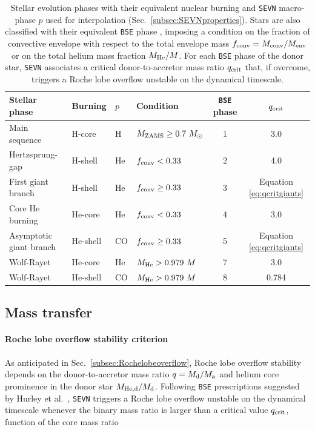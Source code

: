 \documentclass[a4paper,titlepage]{book}     	%
\newcommand{\sun}{\ensuremath{_\odot}}
\newcommand{\mzams}{M_\textup{ZAMS}}
\newcommand{\msun}{\ensuremath{M\sun}}
\begin{document}
\begin{table}
    \centering
    \begin{tabular}{llllcc}
        \toprule
        Stellar phase & Burning & $p$ & Condition & \texttt{BSE} phase &  $q_{\rm crit}$ \\ 
        \midrule
        Main sequence           & H-core    &  H   & $\mzams \geq 0.7~\msun$          &  1  & 3.0        \\
        Hertzsprung-gap         & H-shell   &  He  & $f_{\rm conv} < 0.33$       &  2  & 4.0        \\
        First giant branch      & H-shell   &  He  & $f_{\rm conv} \geq 0.33$    &  3  & Equation \ref{eq:qcritgiants} \\
        Core He burning         & He-core   &  He  & $f_{\rm conv} < 0.33$       &  4  & 3.0 \\ 
        Asymptotic giant branch & He-shell  &  CO  & $f_{\rm conv} \geq 0.33$    &  5  & Equation \ref{eq:qcritgiants} \\
        \hline
        Wolf-Rayet              & He-core   &  He  & $M_{\rm He} > 0.979~M$  &  7  & 3.0 \\ 
        Wolf-Rayet              & He-shell  &  CO  & $M_{\rm He} > 0.979~M$  &  8  & 0.784 \\ 
        \bottomrule
        \end{tabular}
    \caption{Stellar evolution phases with their equivalent nuclear burning and \texttt{SEVN} macro-phase $p$ used for interpolation (Sec.\ \ref{subsec:SEVNproperties}). Stars are also classified with their equivalent \texttt{BSE} phase \cite{Hurley2002}, imposing a condition on the fraction of convective envelope with respect to the total envelope mass $f_{\rm conv}= M_{\rm conv}/M_{\rm env}$ or on the total helium mass fraction $M_{\rm He}/M$. For each \texttt{BSE} phase of the donor star, \texttt{SEVN} associates a critical donor-to-accretor mass ratio $q_{\rm crit}$ that, if overcome, triggers a Roche lobe overflow unstable on the dynamical timescale.}\label{tab:phasesqcritSEVN}
\end{table}



\subsection{Mass transfer}\label{subsec:masstransferSEVN}
\paragraph{Roche lobe overflow stability criterion} As anticipated in Sec.\ \ref{subsec:Rochelobeoverflow}, Roche lobe overflow stability depends on the donor-to-accretor mass ratio $q=M_{\rm d}/M_{\rm a}$ and helium core prominence in the donor star $M_{\rm He,d}/M_{\rm d}$. Following \texttt{BSE} prescriptions suggested by Hurley et al.\ \cite{Hurley2002}, \texttt{SEVN} triggers a Roche lobe overflow unstable on the dynamical timescale whenever the binary mass ratio is larger than a critical value $q_{\rm crit}$, function of the core mass ratio
\end{document}
